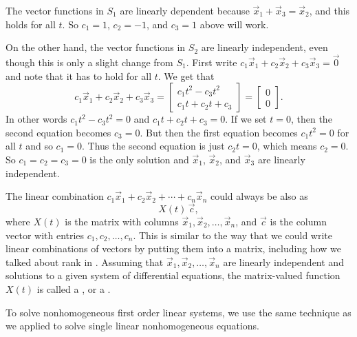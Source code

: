 \documentclass{ximera}
\begin{document}
\begin{exampleSol}
    The vector functions in $S_1$ are linearly dependent because $\vec{x}_1 + \vec{x}_3 = \vec{x}_2$, and this holds for all $t$.  So $c_1 = 1$, $c_2 = -1$, and $c_3 = 1$ above will work.
    
    On the other hand, the vector functions in $S_2$ are linearly independent, even though this is only a slight change from $S_1$. First write $c_1 \vec{x}_1 + c_2 \vec{x}_2 + c_3 \vec{x}_3  = \vec{0}$ and note that it has to hold for all $t$.  We get that
    \begin{equation*}
        c_1 \vec{x}_1 + c_2 \vec{x}_2 + c_3 \vec{x}_3=
        \begin{bmatrix}
            c_1 t^2 - c_3 t^2\\
            c_1 t + c_2 t + c_3 
        \end{bmatrix}
        =
        \begin{bmatrix}
            0 \\
            0
        \end{bmatrix} .
    \end{equation*}
    In other words $c_1 t^2 - c_3 t^2 = 0$ and $c_1 t + c_2 t + c_3 = 0$. If we set $t = 0$, then the second equation becomes $c_3 = 0$.  But then the first equation becomes $c_1 t^2 = 0$ for all $t$ and so $c_1 = 0$.  Thus the second equation is just $c_2 t = 0$, which means $c_2 = 0$.  So $c_1 = c_2 = c_3 = 0$ is the only solution and $\vec{x}_1$, $\vec{x}_2$, and $\vec{x}_3$ are linearly independent.
\end{exampleSol}

The linear combination $c_1 \vec{x}_1 + c_2 \vec{x}_2 + \cdots + c_n \vec{x}_n$ could always be also as
\begin{equation*}
    X(t)\,\vec{c} ,
\end{equation*}
where $X(t)$ is the matrix with columns $\vec{x}_1, \vec{x}_2, \ldots, \vec{x}_n$, and $\vec{c}$ is the column vector with entries $c_1, c_2, \ldots, c_n$. This is similar to the way that we could write linear combinations of vectors by putting them into a matrix, including how we talked about rank in . Assuming that $\vec{x}_1,\vec{x}_2,\ldots,\vec{x}_n$ are linearly independent and solutions to a given system of differential equations, the matrix-valued function $X(t)$ is called a \emph{}, or a \emph{}.

To solve nonhomogeneous first order linear systems, we use the same technique as we applied to solve single linear nonhomogeneous equations.
\end{document}
